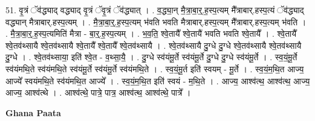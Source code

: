 \documentclass[17pt]{extarticle}
\begin{document}
51. वृ॒त्रं ॅव॑द्ध्याद् वद्ध्याद् वृ॒त्रं ॅवृ॒त्रं ॅव॑द्ध्यात् । . व॒द्ध्या॒न् मै॒त्रा॒बा॒र्॒.ह॒स्प॒त्यम् मै᳚त्राबार्.हस्प॒त्यं ॅव॑द्ध्याद् वद्ध्यान् मैत्राबार्.हस्प॒त्यम् । . मै॒त्रा॒बा॒र्॒.ह॒स्प॒त्यम् भ॑वति भवति मैत्राबार्.हस्प॒त्यम् मै᳚त्राबार्.हस्प॒त्यम् भ॑वति । . मै॒त्रा॒बा॒र्॒.ह॒स्प॒त्यमिति॑ मैत्रा - बा॒र्॒.ह॒स्प॒त्यम् । . भ॒व॒ति॒ श्वे॒तायै᳚ श्वे॒तायै॑ भवति भवति श्वे॒तायै᳚ । . श्वे॒तायै᳚ श्वे॒तव॑थ्सायै श्वे॒तव॑थ्सायै श्वे॒तायै᳚ श्वे॒तायै᳚ श्वे॒तव॑थ्सायै । . श्वे॒तव॑थ्सायै दु॒ग्धे दु॒ग्धे श्वे॒तव॑थ्सायै श्वे॒तव॑थ्सायै दु॒ग्धे । . श्वे॒तव॑थ्साया॒ इति॑ श्वे॒त - व॒थ्सा॒यै॒ । . दु॒ग्धे स्व॑यंमू॒र्ते स्व॑यंमू॒र्ते दु॒ग्धे दु॒ग्धे स्व॑यंमू॒र्ते । . स्व॒यं॒मू॒र्ते स्व॑यंमथि॒ते स्व॑यंमथि॒ते स्व॑यंमू॒र्ते स्व॑यंमू॒र्ते स्व॑यंमथि॒ते । . स्व॒यं॒मू॒र्त इति॑ स्वयम् - मू॒र्ते । . स्व॒यं॒म॒थि॒त आज्य॒ आज्ये᳚ स्वयंमथि॒ते स्व॑यंमथि॒त आज्ये᳚ । . स्व॒यं॒म॒थि॒त इति॑ स्वयं - म॒थि॒ते । . आज्य॒ आश्व॑त्थ॒ आश्व॑त्थ॒ आज्य॒ आज्य॒ आश्व॑त्थे । . आश्व॑त्थे॒ पात्रे॒ पात्र॒ आश्व॑त्थ॒ आश्व॑त्थे॒ पात्रे᳚ । \newline

\textbf{Ghana Paata } \newline
\end{document}
